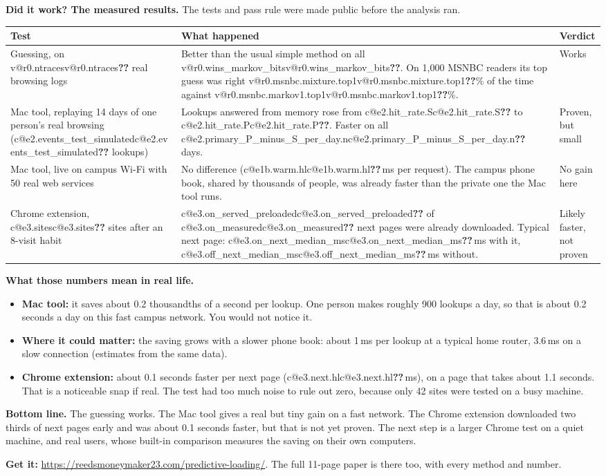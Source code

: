 \documentclass[10pt]{article}
\makeatletter
\newcommand{\C}[1]{\ifcsname c@#1\endcsname\csname c@#1\endcsname\else\textbf{??}\errmessage{missing confirm value #1}\fi}
\newcommand{\V}[1]{\ifcsname v@#1\endcsname\csname v@#1\endcsname\else\textbf{??}\errmessage{missing value #1}\fi}
\makeatother
\begin{document}
\textbf{Did it work? The measured results.} The tests and pass rule were made public before the analysis ran.
\begin{center}\small
\begin{tabular}{@{}p{}p{}p{}@{}}
\toprule
Test & What happened & Verdict \\
\midrule
Guessing, on \V{r0.ntraces} real browsing logs & Better than the usual simple method on all \V{r0.wins_markov_bits}. On 1{,}000 MSNBC readers its top guess was right \V{r0.msnbc.mixture.top1}\% of the time against \V{r0.msnbc.markov1.top1}\%. & Works \\
Mac tool, replaying 14 days of one person's real browsing (\C{e2.events_test_simulated} lookups) & Lookups answered from memory rose from \C{e2.hit_rate.S} to \C{e2.hit_rate.P}. Faster on all \C{e2.primary_P_minus_S_per_day.n} days. & Proven, but small \\
Mac tool, live on campus Wi-Fi with 50 real web services & No difference (\C{e1b.warm.hl}\,ms per request). The campus phone book, shared by thousands of people, was already faster than the private one the Mac tool runs. & No gain here \\
Chrome extension, \C{e3.sites} sites after an 8-visit habit & \C{e3.on_served_preloaded} of \C{e3.on_measured} next pages were already downloaded. Typical next page: \C{e3.on_next_median_ms}\,ms with it, \C{e3.off_next_median_ms}\,ms without. & Likely faster, not proven \\
\bottomrule
\end{tabular}
\end{center}

\textbf{What those numbers mean in real life.}
\begin{itemize}
\item \textbf{Mac tool:} it saves about 0.2 thousandths of a second per lookup. One person makes roughly 900 lookups a day, so that is about 0.2 seconds a day on this fast campus network. You would not notice it.
\item \textbf{Where it could matter:} the saving grows with a slower phone book: about 1\,ms per lookup at a typical home router, 3.6\,ms on a slow connection (estimates from the same data).
\item \textbf{Chrome extension:} about 0.1 seconds faster per next page (\C{e3.next.hl}\,ms), on a page that takes about 1.1 seconds. That is a noticeable snap if real. The test had too much noise to rule out zero, because only 42 sites were tested on a busy machine.
\end{itemize}

\textbf{Bottom line.} The guessing works. The Mac tool gives a real but tiny gain on a fast network. The Chrome extension downloaded two thirds of next pages early and was about 0.1 seconds faster, but that is not yet proven. The next step is a larger Chrome test on a quiet machine, and real users, whose built-in comparison measures the saving on their own computers.

\textbf{Get it:} \url{https://reedsmoneymaker23.com/predictive-loading/}. The full 11-page paper is there too, with every method and number.
\end{document}
